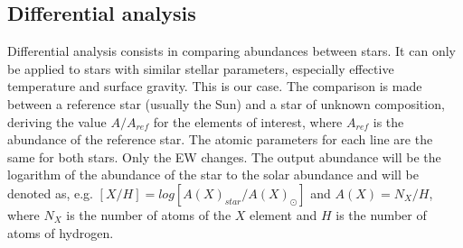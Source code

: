 \documentclass[dvips,12pt,a4paper]{report}
\begin{document}
{%







\subsection {Differential analysis}
\label {difanal}


Differential analysis consists in comparing abundances between stars. It can only be applied to stars with similar stellar parameters, especially effective temperature and surface gravity. This is our case.  The comparison is made between a reference star (usually the Sun) and a star of unknown composition, deriving the value $A/A_{ref}$ for the elements of interest, where $A_{ref}$ is the abundance of the reference star. The atomic parameters for each line are the same for both stars. Only the EW changes. The output abundance will be the logarithm of the abundance of the star to the solar abundance and will be denoted as, e.g. $[X/H]=log[A(X)_{star}/A(X)_\odot]$ and $A(X)=N_X/H$, where $N_X$ is the number of atoms of the $X$ element and $H$ is the number of atoms of hydrogen. %

}
\end{document}
